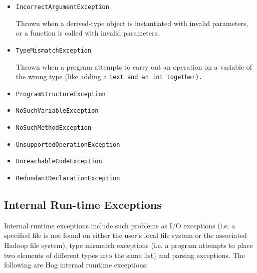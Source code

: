 \documentclass{article}
\begin{document}
\begin{itemize}
  \item[] \tt IncorrectArgumentException \rm
  
  Thrown when a derived-type object is instantiated with invalid parameters, or a function is called with invalid parameters.
  
  \item[] \tt TypeMismatchException \rm
  
  Thrown when a program attempts to carry out an operation on a variable of the wrong type (like adding a \tt text \rm and an
  \tt int \rm together).
  \item[] \tt ProgramStructureException \rm
  \item[] \tt NoSuchVariableException \rm
  \item[] \tt NoSuchMethodException \rm
  \item[] \tt UnsupportedOperationException \rm
  \item[] \tt UnreachableCodeException \rm
  \item[] \tt RedundantDeclarationException \rm
\end{itemize}


\subsection{Internal Run-time Exceptions} %
\label{sub:internal_run_time_exceptions}

Internal run­time exceptions include such problems as I/O exceptions (i.e. a specified file is not found on either the user’s
local file system or the associated Hadoop file system), type mismatch exceptions (i.e. a program attempts to place two
elements of different types into the same list) and parsing exceptions. The following are Hog internal rum­time exceptions:
\end{document}
